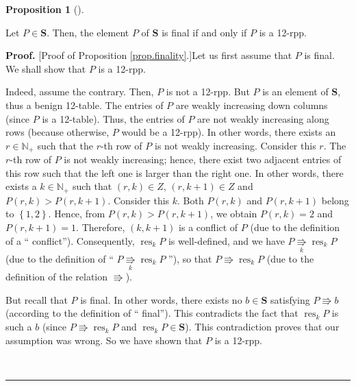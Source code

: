 \documentclass[numbers=enddot,12pt,final,onecolumn,notitlepage]{scrartcl}%
\theoremstyle{definition}
\newtheorem{prop}[theo]{Proposition}
\newenvironment{proposition}[1][]
{\begin{prop}[#1]\begin{leftbar}}
{\end{leftbar}\end{prop}}
\newenvironment{proof}[1][Proof]{\noindent\textbf{#1.} }{\ \rule{0.5em}{0.5em}}
\newenvironment{vershort}{}{}
\begin{document}
\begin{proposition}
\label{prop.finality}Let $P\in\mathbf{S}$. Then, the element $P$ of
$\mathbf{S}$ is final if and only if $P$ is a 12-rpp.
\end{proposition}

\begin{vershort}
\begin{proof}
[Proof of Proposition \ref{prop.finality}.]Let us first assume that $P$ is
final. We shall show that $P$ is a 12-rpp.

Indeed, assume the contrary. Then, $P$ is not a 12-rpp. But $P$ is an element
of $\mathbf{S}$, thus a benign 12-table. The entries of $P$ are weakly
increasing down columns (since $P$ is a 12-table). Thus, the entries of $P$
are not weakly increasing along rows (because otherwise, $P$ would be a
12-rpp). In other words, there exists an $r\in\mathbb{N}_{+}$ such that the
$r$-th row of $P$ is not weakly increasing. Consider this $r$. The $r$-th row
of $P$ is not weakly increasing; hence, there exist two adjacent entries of
this row such that the left one is larger than the right one. In other words,
there exists a $k\in\mathbb{N}_{+}$ such that $\left(  r,k\right)  \in Z$,
$\left(  r,k+1\right)  \in Z$ and $P\left(  r,k\right)  >P\left(
r,k+1\right)  $. Consider this $k$. Both $P\left(  r,k\right)  $ and $P\left(
r,k+1\right)  $ belong to $\left\{  1,2\right\}  $. Hence, from $P\left(
r,k\right)  >P\left(  r,k+1\right)  $, we obtain $P\left(  r,k\right)  =2$ and
$P\left(  r,k+1\right)  =1$. Therefore, $\left(  k,k+1\right)  $ is a conflict
of $P$ (due to the definition of a \textquotedblleft
conflict\textquotedblright). Consequently, $\operatorname*{res}\nolimits_{k}P$
is well-defined, and we have $P\underset{k}{\Rrightarrow}\operatorname*{res}%
\nolimits_{k}P$ (due to the definition of \textquotedblleft%
$P\underset{k}{\Rrightarrow}\operatorname*{res}\nolimits_{k}P$%
\textquotedblright), so that $P\Rrightarrow\operatorname*{res}\nolimits_{k}P$
(due to the definition of the relation $\Rrightarrow$).

But recall that $P$ is final. In other words, there exists no $b\in\mathbf{S}$
satisfying $P\Rrightarrow b$ (according to the definition of \textquotedblleft
final\textquotedblright). This contradicts the fact that $\operatorname*{res}%
\nolimits_{k}P$ is such a $b$ (since $P\Rrightarrow\operatorname*{res}%
\nolimits_{k}P$ and $\operatorname*{res}\nolimits_{k}P\in\mathbf{S}$). This
contradiction proves that our assumption was wrong. So we have shown that $P$
is a 12-rpp.


\end{proof}
\end{vershort}
\end{document}
